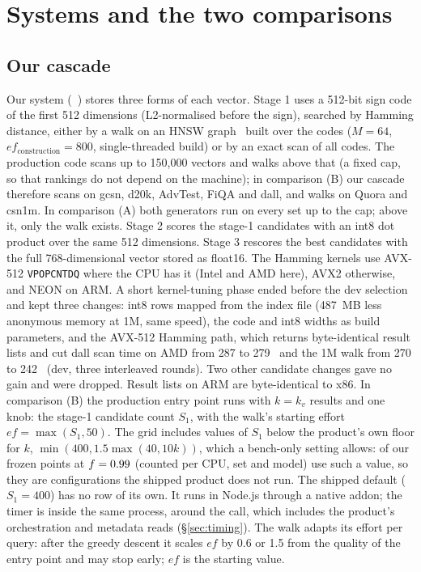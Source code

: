 \section{Systems and the two comparisons}\label{sec:systems}

\subsection{Our cascade}

Our system (\sweet~\cite{sweetsearch_repo}) stores three forms of each vector. Stage 1 uses a
512-bit sign code of the first 512 dimensions (L2-normalised before the sign), searched by Hamming
distance, either by a walk on an HNSW graph~\cite{malkov2020hnsw} built over the codes ($M = 64$,
$ef_{\text{construction}} = 800$, single-threaded build) or by an exact scan of all codes. The
production code scans up to 150,000 vectors and walks above that (a fixed cap, so that rankings do not
depend on the machine); in comparison (B) our cascade therefore scans on gcsn, d20k, AdvTest, FiQA and
dall, and walks on Quora and csn1m. In comparison (A) both generators run on every set up to the cap;
above it, only the walk exists. Stage 2
scores the stage-1 candidates with an int8 dot product over the same 512 dimensions. Stage 3 rescores
the best candidates with the full 768-dimensional vector stored as float16. The Hamming kernels use
AVX-512 \texttt{VPOPCNTDQ} where the CPU has it (Intel and AMD here), AVX2 otherwise, and NEON on ARM.
A short kernel-tuning phase ended before the dev selection and kept three changes: int8 rows mapped
from the index file (487~MB less anonymous memory at 1M, same speed), the code and int8 widths as build
parameters, and the AVX-512 Hamming path, which returns byte-identical result lists and cut dall scan
time on AMD from 287 to 279~\us{} and the 1M walk from 270 to 242~\us{} (dev, three interleaved rounds). Two
other candidate changes gave no gain and were dropped. Result lists on ARM are byte-identical to x86.
In comparison (B) the production entry point runs with $k = k_v$ results and one knob: the stage-1
candidate count $S_1$, with the walk's starting effort $ef = \max(S_1, 50)$. The grid includes values of
$S_1$ below the product's own floor for $k$, $\min(400, 1.5\max(40, 10k))$, which a bench-only setting
allows:  of our  frozen points at $f = 0.99$ (counted per CPU, set and model) use such a value, so they
are configurations the shipped product does not run. The shipped default ($S_1 = 400$) has no row of its
own. It runs in Node.js through a native addon; the timer
is inside the same process, around the call, which includes the product's orchestration and metadata
reads (\S\ref{sec:timing}). The walk adapts its effort per query: after the greedy descent it scales
$ef$ by 0.6 or 1.5 from the quality of the entry point and may stop early; $ef$ is the starting value.

